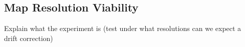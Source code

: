 \subsection{Map Resolution Viability}

Explain what the experiment is (test under what resolutions can we expect a drift correction)



